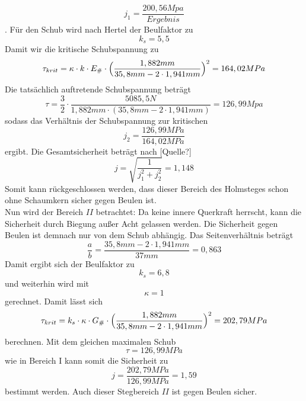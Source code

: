 \begin{equation}
	j_{1}=\frac{200,56 Mpa}{Ergebnis}
\end{equation}. Für den Schub wird nach Hertel der Beulfaktor zu
\begin{equation}
	k_{s}=5,5
\end{equation}
Damit wir die kritische Schubspannung zu 
\begin{equation}
	\tau_{krit}=\kappa\cdot k\cdot E_{\#}\cdot\Bigl(\frac{1,88 2mm}{35,8 mm - 2\cdot 1,941  mm}\Bigr)^{2}=164,02 MPa
\end{equation}
Die tatsächlich auftretende Schubspannung beträgt 
\begin{equation}
	\tau=\frac{3}{2}\cdot \frac{5085,5 N}{1,882 mm\cdot(35,8 mm-2\cdot 1,941 mm)}=126,99 Mpa
\end{equation}
sodass das Verhältnis der Schubspannung zur kritischen 
\begin{equation}
	j_{2}=\frac{126,99 MPa}{164,02 MPa}
\end{equation}
ergibt. Die Gesamtsicherheit beträgt nach [Quelle?]
\begin{equation}
	j=\sqrt{\frac{1}{j_{1}^{2}+j_{2}^{2}}}=1,148
\end{equation}
Somit kann rückgeschlossen werden, dass dieser Bereich des Holmsteges schon ohne Schaumkern sicher gegen Beulen ist.\\

\noindent Nun wird der Bereich $II$ betrachtet:
Da keine innere Querkraft herrscht, kann die Sicherheit durch Biegung außer Acht gelassen werden. Die Sicherheit gegen Beulen ist demnach nur von dem Schub abhängig.
Das Seitenverhältnis beträgt 
\begin{equation}
	\frac{a}{b}=\frac{35,8mm - 2\cdot 1,941mm}{37mm}=0,863
\end{equation}
Damit ergibt sich der Beulfaktor zu 
\begin{equation}
	k_{s}=6,8
\end{equation}
und weiterhin wird mit 
\begin{equation}
	\kappa = 1 
\end{equation}
gerechnet. Damit lässt sich 
\begin{equation}
	 \tau_{krit} = k_{s}\cdot \kappa\cdot G_{\#}\cdot \Bigl(\frac{1,882mm}{35,8mm-2\cdot 1,941mm}\Bigr)^{2}= 202,79 MPa
\end{equation}
berechnen. Mit dem gleichen maximalen Schub
\begin{equation}
	\tau=126,99 MPa
\end{equation}
 wie in Bereich I kann somit die Sicherheit zu 
 \begin{equation}
 	j=\frac{202,79MPa}{126,99MPa}=1,59
 \end{equation}
bestimmt werden. Auch dieser Stegbereich $II$ ist gegen Beulen sicher.\\

